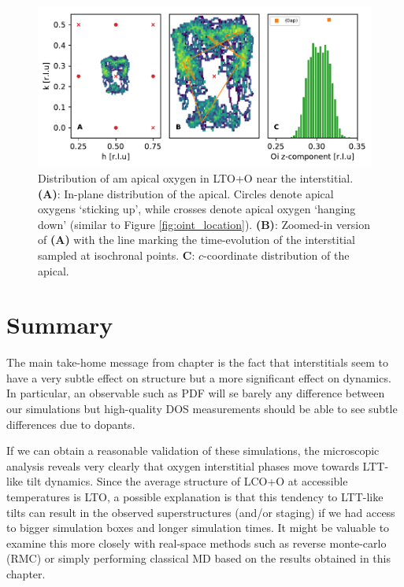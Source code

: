 \begin{figure}
	\centering
	\includegraphics[width=\textwidth]{fig/md/diffusion2.pdf}
	\caption[MD Oint Diffusion Oap 1]{Distribution of am apical oxygen in LTO+O near the interstitial. \textbf{(A)}: In-plane distribution of the apical. Circles denote apical oxygens `sticking up', while crosses denote apical oxygen `hanging down' (similar to Figure \ref{fig:oint_location}). \textbf{(B)}: Zoomed-in version of \textbf{(A)} with the line marking the time-evolution of the interstitial sampled at isochronal points. \textbf{C}: $c$-coordinate distribution of the apical.}
	\label{fig:md_diffusion2}
\end{figure}

\section{Summary}
The main take-home message from chapter is the fact that interstitials seem to have a very subtle effect on structure but a more significant effect on dynamics. In particular, an observable such as PDF will se barely any difference between our simulations but high-quality DOS measurements should be able to see subtle differences due to dopants.

If we can obtain a reasonable validation of these simulations, the microscopic analysis reveals very clearly that oxygen interstitial phases move towards LTT-like tilt dynamics. Since the average structure of LCO+O at accessible temperatures is LTO, a possible explanation is that this tendency to LTT-like tilts can result in the observed superstructures (and/or staging) if we had access to bigger simulation boxes and longer simulation times. It might be valuable to examine this more closely with real-space methods such as reverse monte-carlo (RMC) or simply performing classical MD based on the results obtained in this chapter.

